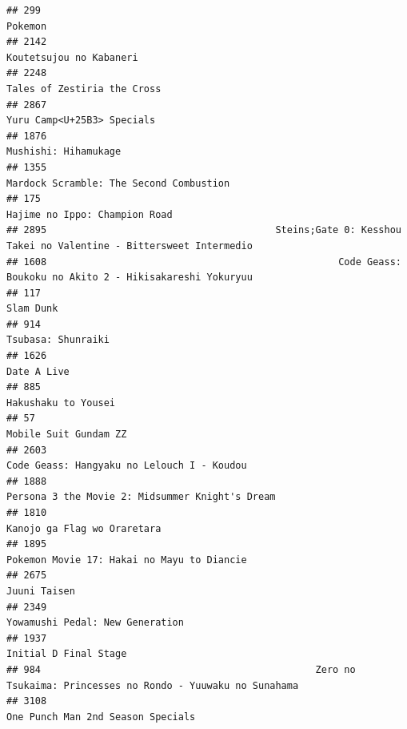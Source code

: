 \documentclass[
]{article}
\begin{document}
\begin{verbatim}
## 299                                                                                                    Pokemon
## 2142                                                                                   Koutetsujou no Kabaneri
## 2248                                                                               Tales of Zestiria the Cross
## 2867                                                                                Yuru Camp<U+25B3> Specials
## 1876                                                                                      Mushishi: Hihamukage
## 1355                                                                   Mardock Scramble: The Second Combustion
## 175                                                                              Hajime no Ippo: Champion Road
## 2895                                        Steins;Gate 0: Kesshou Takei no Valentine - Bittersweet Intermedio
## 1608                                                   Code Geass: Boukoku no Akito 2 - Hikisakareshi Yokuryuu
## 117                                                                                                  Slam Dunk
## 914                                                                                         Tsubasa: Shunraiki
## 1626                                                                                               Date A Live
## 885                                                                                        Hakushaku to Yousei
## 57                                                                                       Mobile Suit Gundam ZZ
## 2603                                                                Code Geass: Hangyaku no Lelouch I - Koudou
## 1888                                                           Persona 3 the Movie 2: Midsummer Knight's Dream
## 1810                                                                               Kanojo ga Flag wo Oraretara
## 1895                                                                Pokemon Movie 17: Hakai no Mayu to Diancie
## 2675                                                                                              Juuni Taisen
## 2349                                                                           Yowamushi Pedal: New Generation
## 1937                                                                                     Initial D Final Stage
## 984                                                Zero no Tsukaima: Princesses no Rondo - Yuuwaku no Sunahama
## 3108                                                                         One Punch Man 2nd Season Specials

\end{verbatim}
\end{document}
